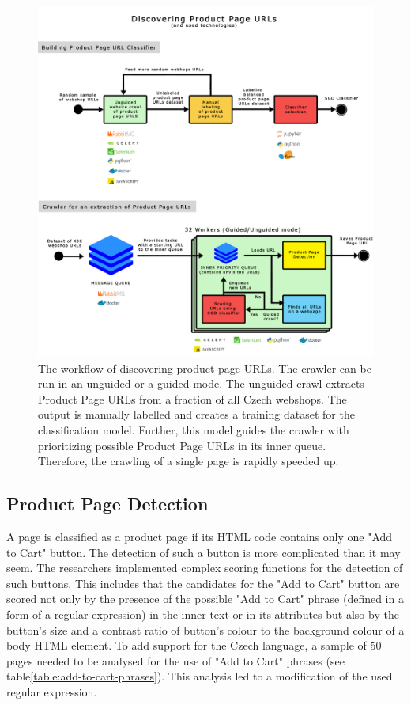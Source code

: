         \begin{figure}[ht]
            \centering
            \includegraphics[width=1\linewidth]{media/data_collection.png}
            \caption{The workflow of discovering product page URLs. The crawler can be run in an unguided or a guided mode. The unguided crawl extracts Product Page URLs from a fraction of all Czech webshops. The output is manually labelled and creates a training dataset for the classification model. Further, this model guides the crawler with prioritizing possible Product Page URLs in its inner queue. Therefore, the crawling of a single page is rapidly speeded up.}
            \label{fig:data_collection}
        \end{figure}

        \subsection{Product Page Detection}
        \label{section:product-page-detection}
        A page is classified as a product page if its HTML code contains only one "Add to Cart" button. The detection of such a button is more complicated than it may seem. The researchers implemented complex scoring functions for the detection of such buttons. This includes that the candidates for the "Add to Cart" button are scored not only by the presence of the possible "Add to Cart" phrase (defined in a form of a regular expression) in the inner text or in its attributes but also by the button's size and a contrast ratio of button's colour to the background colour of a body HTML element. To add support for the Czech language, a sample of 50 pages needed to be analysed for the use of "Add to Cart" phrases (see table\ref{table:add-to-cart-phrases}). This analysis led to a modification of the used regular expression.

